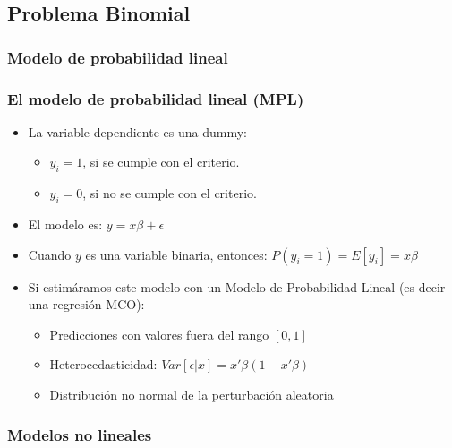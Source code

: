 \subsection{Problema Binomial}

\subsubsection{Modelo de probabilidad lineal}

\begin{frame}[fragile]
	\frametitle{El modelo de probabilidad lineal (MPL)}
	\begin{itemize}
		\item La variable dependiente es una dummy:
		\begin{itemize}
			\item $y_i=1$, si se cumple con el criterio.
			\item $y_i=0$, si no se cumple con el criterio.
		\end{itemize}
		
		\item El modelo es: $y=x\beta+\epsilon$
		
		\item Cuando $y$ es una variable binaria, entonces: $P(y_i=1)=E[y_i]=x\beta$
		
		\item Si estimáramos este modelo con un Modelo de Probabilidad Lineal (es decir una regresión
		MCO):
		
		\begin{itemize}
			\item Predicciones con valores fuera del rango $[0,1]$
			\item Heterocedasticidad: $Var[\epsilon|x]=x'\beta(1-x'\beta)$
			\item Distribución no normal de la perturbación aleatoria
		\end{itemize}
	\end{itemize}
\end{frame}

\subsubsection{Modelos no lineales}


